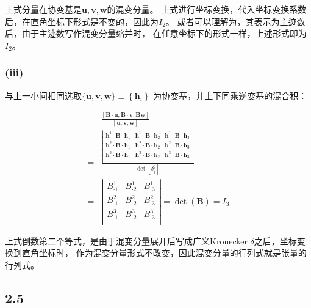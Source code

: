 \documentclass[UTF8,zihao=5]{ctexart}
\newcommand{\bm}[1]{{\mathbf{#1}}}
\begin{document}
上式分量在协变基是$\bm{u},\bm{v},\bm{w}$的混变分量。
上式进行坐标变换，代入坐标变换系数后，在直角坐标下形式是不变的，因此为$I_2$。
或者可以理解为，其表示为主迹数后，由于主迹数写作混变分量缩并时，
在任意坐标下的形式一样，上述形式即为
$I_2$。

\subsubsection*{(iii)}

与上一小问相同选取$\{\bm{u},\bm{v},\bm{w}\}\equiv\left\{\bm{h}_i\right\}$
为协变基，并上下同乘逆变基的混合积：

\begin{equation}
    \begin{aligned}
          & \frac{
            [\bm{B}\cdot\bm{u}, \bm{B}\cdot\bm{v}, \bm{B}\bm{w}]}
        {[\bm{u}, \bm{v}, \bm{w}]}
        \\
        = &
        \frac{
            \left|
            \begin{matrix}
                \bm{h}^1\cdot\bm{B}\cdot\bm{h}_1 & \bm{h}^1\cdot\bm{B}\cdot\bm{h}_2 & \bm{h}^1\cdot\bm{B}\cdot\bm{h}_3 \\
                \bm{h}^2\cdot\bm{B}\cdot\bm{h}_1 & \bm{h}^2\cdot\bm{B}\cdot\bm{h}_2 & \bm{h}^2\cdot\bm{B}\cdot\bm{h}_3 \\
                \bm{h}^3\cdot\bm{B}\cdot\bm{h}_1 & \bm{h}^3\cdot\bm{B}\cdot\bm{h}_2 & \bm{h}^3\cdot\bm{B}\cdot\bm{h}_3 \\
            \end{matrix}
            \right|
        }{\det{[\delta_i^j]}} \\
        = &
        \left|
        \begin{matrix}
            B^1_{\cdot1} & B^1_{\cdot2} & B^1_{\cdot3} \\
            B^2_{\cdot1} & B^2_{\cdot2} & B^2_{\cdot3} \\
            B^3_{\cdot1} & B^3_{\cdot2} & B^3_{\cdot3} \\
        \end{matrix}
        \right| = \det{(\bm{B})}=I_3
    \end{aligned}
\end{equation}

上式倒数第二个等式，是由于混变分量展开后写成广义Kronecker $\delta$之后，坐标变换到直角坐标时，
作为混变分量形式不改变，因此混变分量的行列式就是张量的行列式。

\subsection*{2.5}
\end{document}
